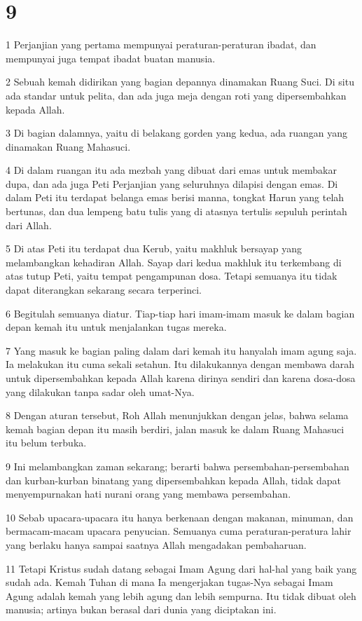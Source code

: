\chapter{9}

\par 1 Perjanjian yang pertama mempunyai peraturan-peraturan ibadat, dan mempunyai juga tempat ibadat buatan manusia.
\par 2 Sebuah kemah didirikan yang bagian depannya dinamakan Ruang Suci. Di situ ada standar untuk pelita, dan ada juga meja dengan roti yang dipersembahkan kepada Allah.
\par 3 Di bagian dalamnya, yaitu di belakang gorden yang kedua, ada ruangan yang dinamakan Ruang Mahasuci.
\par 4 Di dalam ruangan itu ada mezbah yang dibuat dari emas untuk membakar dupa, dan ada juga Peti Perjanjian yang seluruhnya dilapisi dengan emas. Di dalam Peti itu terdapat belanga emas berisi manna, tongkat Harun yang telah bertunas, dan dua lempeng batu tulis yang di atasnya tertulis sepuluh perintah dari Allah.
\par 5 Di atas Peti itu terdapat dua Kerub, yaitu makhluk bersayap yang melambangkan kehadiran Allah. Sayap dari kedua makhluk itu terkembang di atas tutup Peti, yaitu tempat pengampunan dosa. Tetapi semuanya itu tidak dapat diterangkan sekarang secara terperinci.
\par 6 Begitulah semuanya diatur. Tiap-tiap hari imam-imam masuk ke dalam bagian depan kemah itu untuk menjalankan tugas mereka.
\par 7 Yang masuk ke bagian paling dalam dari kemah itu hanyalah imam agung saja. Ia melakukan itu cuma sekali setahun. Itu dilakukannya dengan membawa darah untuk dipersembahkan kepada Allah karena dirinya sendiri dan karena dosa-dosa yang dilakukan tanpa sadar oleh umat-Nya.
\par 8 Dengan aturan tersebut, Roh Allah menunjukkan dengan jelas, bahwa selama kemah bagian depan itu masih berdiri, jalan masuk ke dalam Ruang Mahasuci itu belum terbuka.
\par 9 Ini melambangkan zaman sekarang; berarti bahwa persembahan-persembahan dan kurban-kurban binatang yang dipersembahkan kepada Allah, tidak dapat menyempurnakan hati nurani orang yang membawa persembahan.
\par 10 Sebab upacara-upacara itu hanya berkenaan dengan makanan, minuman, dan bermacam-macam upacara penyucian. Semuanya cuma peraturan-peratura lahir yang berlaku hanya sampai saatnya Allah mengadakan pembaharuan.
\par 11 Tetapi Kristus sudah datang sebagai Imam Agung dari hal-hal yang baik yang sudah ada. Kemah Tuhan di mana Ia mengerjakan tugas-Nya sebagai Imam Agung adalah kemah yang lebih agung dan lebih sempurna. Itu tidak dibuat oleh manusia; artinya bukan berasal dari dunia yang diciptakan ini.
